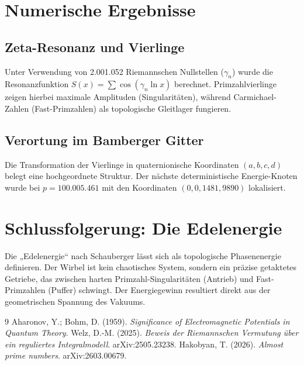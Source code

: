 \documentclass[11pt,a4paper]{article}
\begin{document}
	\section{Numerische Ergebnisse}
	
	\subsection{Zeta-Resonanz und Vierlinge}
	Unter Verwendung von 2.001.052 Riemannschen Nullstellen ($\gamma_n$) wurde die Resonanzfunktion $S(x) = \sum \cos(\gamma_n \ln x)$ berechnet. Primzahlvierlinge zeigen hierbei maximale Amplituden (Singularitäten), während Carmichael-Zahlen (Fast-Primzahlen) als topologische Gleitlager fungieren.
	
	
	\subsection{Verortung im Bamberger Gitter}
	Die Transformation der Vierlinge in quaternionische Koordinaten $(a,b,c,d)$ belegt eine hochgeordnete Struktur. Der nächste deterministische Energie-Knoten wurde bei $p = 100.005.461$ mit den Koordinaten $(0, 0, 1481, 9890)$ lokalisiert.
	
	\section{Schlussfolgerung: Die Edelenergie}
	Die „Edelenergie“ nach Schauberger lässt sich als topologische Phasenenergie definieren. Der Wirbel ist kein chaotisches System, sondern ein präzise getaktetes Getriebe, das zwischen harten Primzahl-Singularitäten (Antrieb) und Fast-Primzahlen (Puffer) schwingt. Der Energiegewinn resultiert direkt aus der geometrischen Spannung des Vakuums.
	
	\begin{thebibliography}{9}
		 Aharonov, Y.; Bohm, D. (1959). \textit{Significance of Electromagnetic Potentials in Quantum Theory}.
		 Welz, D.-M. (2025). \textit{Beweis der Riemannschen Vermutung über ein reguliertes Integralmodell}. arXiv:2505.23238.
		 Hakobyan, T. (2026). \textit{Almost prime numbers}. arXiv:2603.00679.
	\end{thebibliography}
	
\end{document}
